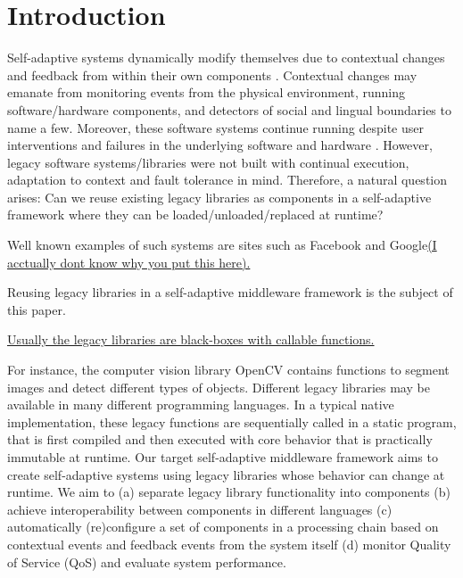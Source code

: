 \documentclass{acm_proc_article-sp}
\begin{document}



\section{Introduction}
\label{sec:introduction}

Self-adaptive systems dynamically modify themselves due to contextual changes and feedback from within their own components \cite{Oreizy}. Contextual changes may emanate from monitoring events from the physical environment, running software/hardware components, and detectors of social and lingual boundaries to name a few. Moreover, these software systems continue running  despite user interventions and failures in the underlying software and hardware \cite{Brun2009}. However, legacy software systems/libraries were not built with continual execution, adaptation to context and fault tolerance in mind. Therefore, a natural question arises: Can we reuse existing legacy libraries as components in a self-adaptive framework where they can be loaded/unloaded/replaced at runtime?

 Well known examples of such systems are sites such as Facebook and Google\underline{(I acctually dont know why you put this here).  }

Reusing legacy libraries in a self-adaptive middleware framework is the subject of this paper. 

\underline{Usually the legacy libraries are black-boxes with callable functions.}

For instance, the  computer vision library OpenCV \cite{Zelinsky2009} contains functions to segment images and detect different types of objects. Different legacy libraries may be available in many different programming languages. In a typical native implementation, these legacy functions are sequentially called in a static program, that is first compiled and then executed with core behavior that is practically immutable at runtime. Our target self-adaptive middleware framework aims to create self-adaptive systems using legacy libraries whose behavior can change at runtime. We aim to (a) separate legacy library functionality into components (b) achieve interoperability between components in different languages (c) automatically (re)configure a set of components in a processing chain based on contextual events and feedback events from the system itself (d) monitor Quality of Service (QoS) and evaluate system performance.
\end{document}
